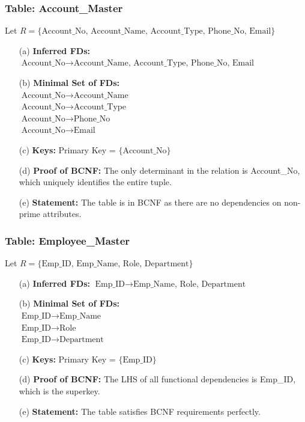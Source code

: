 \documentclass[12pt, a4paper]{article}
\begin{document}
\subsubsection{Table: Account\_Master}
Let $R = \{ \text{Account\_No, Account\_Name, Account\_Type, Phone\_No, Email} \}$
\begin{enumerate}
    \item[(a)] \textbf{Inferred FDs:} $\text{Account\_No} \rightarrow \text{Account\_Name, Account\_Type, Phone\_No, Email}$
    \item[(b)] \textbf{Minimal Set of FDs:} 
    \\ $\text{Account\_No} \rightarrow \text{Account\_Name}$
    \\ $\text{Account\_No} \rightarrow \text{Account\_Type}$
    \\ $\text{Account\_No} \rightarrow \text{Phone\_No}$
    \\ $\text{Account\_No} \rightarrow \text{Email}$
    \item[(c)] \textbf{Keys:} Primary Key = $\{ \text{Account\_No} \}$
    \item[(d)] \textbf{Proof of BCNF:} The only determinant in the relation is Account\_No, which uniquely identifies the entire tuple.
    \item[(e)] \textbf{Statement:} The table is in BCNF as there are no dependencies on non-prime attributes.
\end{enumerate}

\subsubsection{Table: Employee\_Master}
Let $R = \{ \text{Emp\_ID, Emp\_Name, Role, Department} \}$
\begin{enumerate}
    \item[(a)] \textbf{Inferred FDs:} $\text{Emp\_ID} \rightarrow \text{Emp\_Name, Role, Department}$
    \item[(b)] \textbf{Minimal Set of FDs:} 
    \\ $\text{Emp\_ID} \rightarrow \text{Emp\_Name}$
    \\ $\text{Emp\_ID} \rightarrow \text{Role}$
    \\ $\text{Emp\_ID} \rightarrow \text{Department}$
    \item[(c)] \textbf{Keys:} Primary Key = $\{ \text{Emp\_ID} \}$
    \item[(d)] \textbf{Proof of BCNF:} The LHS of all functional dependencies is Emp\_ID, which is the superkey.
    \item[(e)] \textbf{Statement:} The table satisfies BCNF requirements perfectly.
\end{enumerate}
\end{document}
